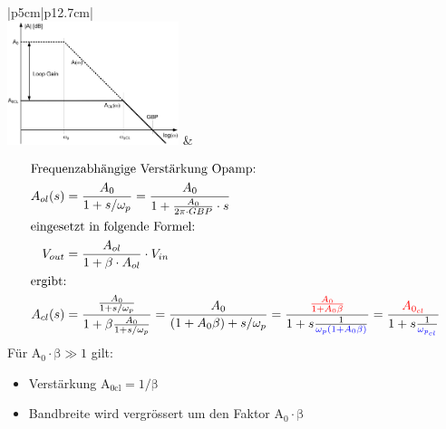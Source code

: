 \begin{longtable}[t]{|p{5cm}|p{12.7cm}|}
    \hline  
    \\ \hdashline
    \includegraphics[width=5cm, valign=t]{pictures/ClosedLoopFreqGang.png}
    & {\vspace{-1.5\topsep}
        \begin{align*}
            \intertext{Frequenzabhängige Verstärkung Opamp:}
            A_{ol}(s) &= \frac{A_0}{1 + s/\omega_p} = \frac{A_0}{1+\frac{A_0}{2\pi \cdot GBP} \cdot s}\\
            \intertext{eingesetzt in folgende Formel:}
            V_{out} &= \frac{A_{ol}}{1 + \beta \cdot A_{ol}} \cdot V_{in}\\
            \intertext{ergibt:}
            A_{cl}(s) &= \frac{\frac{A_0}{1 + s/\omega_p}}{1 + \beta \frac{A_0}{1 + s/\omega_p}} = 
            \frac{A_0}{(1 + A_0 \beta) + s/\omega_p} = 
            \frac{\textcolor{red}{\frac{A_0}{1 + A_0 \beta}}}{1 + s \frac{1}
            {\textcolor{blue}{\omega_p(1 + A_0 \beta)}}} = 
            \frac{\textcolor{red}{A_{0_{cl}}}}{1 + s\frac{1}{\textcolor{blue}{\omega_{p_{cl}}}}}
        \end{align*}
        \newline
        Für $\mathrm{A_0 \cdot \beta \gg 1}$ gilt:\newline
        \vspace{-1.5\topsep}
        \begin{itemize}[leftmargin=*]
            \item Verstärkung $\mathrm{A_{0cl} = 1/\beta}$
            \item Bandbreite wird vergrössert um den Faktor $\mathrm{A_0 \cdot\beta}$
            \newline
        \end{itemize}
        }
\end{longtable}
